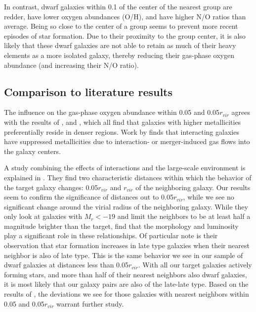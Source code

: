 In contrast, dwarf galaxies within 0.1 \hMpc of the center of the nearest group 
are redder, have lower oxygen abundances (O/H), and have higher N/O ratios than 
average.  Being so close to the center of a group seems to prevent more recent 
episodes of star formation.  Due to their proximity to the group center, it is 
also likely that these dwarf galaxies are not able to retain as much of their 
heavy elements as a more isolated galaxy, thereby reducing their gas-phase 
oxygen abundance (and increasing their N/O ratio).


\subsection{Comparison to literature results}

The influence on the gas-phase oxygen abundance within 0.05 \hMpc and 
0.05$r_{vir}$ agrees with the results of \cite{Shields91,Pustilnik06,Cooper08,
Ellison09,Pustilnik11a,Pustilnik14}, and \cite{SanchezAlmeida16}, which all find 
that galaxies with higher metallicities preferentially reside in denser regions.  
Work by \cite{Rupke08} finds that interacting galaxies have suppressed 
metallicities due to interaction- or merger-induced gas flows into the galaxy 
centers.

A study combining the effects of interactions and the large-scale environment is 
explained in \cite{Park09}.  They find two characteristic distances within which 
the behavior of the target galaxy changes: 0.05$r_{vir}$ and $r_{vir}$ of the 
neighboring galaxy.  Our results seem to confirm the significance of distances 
out to 0.05$r_{vir}$, while we see no significant change around the virial 
radius of the neighboring galaxy.  While they only look at galaxies with 
$M_r < -19$ and limit the neighbors to be at least half a magnitude brighter 
than the target, \cite{Park09} find that the morphology and luminosity play a 
significant role in these relationships.  Of particular note is their 
observation that star formation increases in late type galaxies when their 
nearest neighbor is also of late type.  This is the same behavior we see in our 
sample of dwarf galaxies at distances less than 0.05$r_{vir}$.  With all our 
target galaxies actively forming stars, and more than half of their nearest 
neighbors also dwarf galaxies, it is most likely that our galaxy pairs are also 
of the late-late type.  Based on the results of \cite{Park09}, the deviations we 
see for those galaxies with nearest neighbors within 0.05 \hMpc and 
0.05$r_{vir}$ warrant further study.


